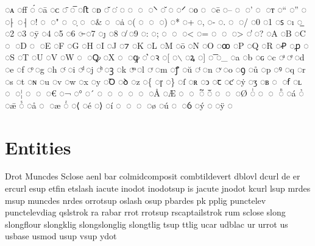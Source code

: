 \documentclass[a4paper,11pt]{article}
\author{Seán Vrieland}
\date{\today}
\title{}
\begin{document}
\tableofcontents

◌ᴀ
◌ﬀ
◌́
◌ā
◌ᴄ
◌̄
◌̅
◌ﬅ
◌ᴅ
◌̆
◌̇
◌	
◌
◌
◌⸌
◌̌
◌
◌⸍
◌ᴏ
◌
◌ē
◌–
◌
◌’
◌
◌ᴛ
◌“
◌”
◌ 
◌⸠
◌⸡
◌!
◌
◌"
◌
◌̣
◌
◌\&
◌
◌ȧ
◌(
◌
◌
◌)
◌*
◌+
◌,
◌-
◌.
◌
◌/
◌0
◌1
◌ꜱ
◌ı
◌̲
◌2
◌3
◌ȳ
◌4
◌5
◌6
◌̶
◌7
◌ȷ
◌8
◌̸
◌9
◌:
◌;
◌
◌
◌<
◌=
◌
◌
◌>
◌̾
◌?
◌A
◌B
◌C
◌
◌D
◌
◌E
◌F
◌G
◌H
◌I
◌J
◌⁊
◌K
◌L
◌M
◌ō
◌N
◌O
◌ꝏ
◌P
◌Q
◌R
◌Ꝓ
◌ꝓ
◌
◌S
◌T
◌U
◌V
◌W
◌
◌Ꝙ
◌X
◌
◌ꝙ
◌͛
◌ꝛ
◌[
◌$\backslash$
◌ꝝ
◌]
◌͞
◌\_
◌a
◌b
◌ɢ
◌c
◌ͣ
◌ͤ
◌d
◌e
◌f
◌ͦ
◌g
◌h
◌ͨ
◌i
◌ͩ
◌j
◌ͪ
◌ꝫ
◌k
◌ͫ
◌l
◌ͬ
◌m
◌ꝭ
◌ŭ
◌ͭ
◌n
◌ͮ
◌o
◌ꝯ
◌ů
◌p
◌ꝰ
◌q
◌r
◌s
◌t
◌ɴ
◌u
◌v
◌w
◌x
◌y
◌Ꝺ
◌ꝺ
◌z
◌\{
◌ɼ
◌\}
◌ſ
◌ʀ
◌ↄ
◌ꞇ
◌ƈ
◌ẏ
◌ʒ
◌ʙ
◌
◌ẜ
◌ʟ
◌
◌¦
◌
◌
◌€
◌¬
◌°
◌´
◌
◌
◌
◌
◌
◌Å
◌Æ
◌
◌
◌᷑
◌ᷓ
◌
◌
◌Ø
◌ᷝ
◌
◌
◌ᷠ
◌á
◌ᷣ
◌ǣ
◌ᷤ
◌å
◌
◌æ
◌ᷦ
◌⟨
◌é
◌⟩
◌í
◌
◌
◌
◌ø
◌ú
◌
◌ỽ
◌ý
◌﻿
◌ÿ
◌

\section{Entities}
\label{sec:orgaf50bfc}
Drot
Muncdes
Sclose
aenl
bar
colmidcomposit
combtildevert
dblovl
dcurl
de
er
ercurl
esup
etfin
etslash
iacute
inodot
inodotsup
is
jacute
jnodot
kcurl
lsup
mrdes
msup
muncdes
nrdes
orrotsup
oslash
osup
pbardes
pk
pplig
punctelev
punctelevdiag
qslstrok
ra
rabar
rrot
rrotsup
rscaptailstrok
rum
sclose
slong
slongflour
slongklig
slongslonglig
slongtlig
tsup
ttlig
ucar
udblac
ur
urrot
us
usbase
usmod
usup
vsup
ydot
\end{document}
